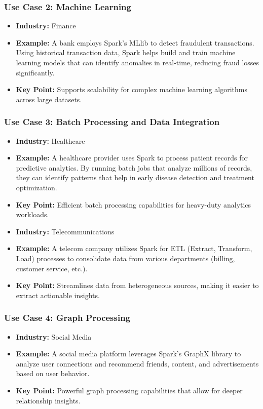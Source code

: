 \documentclass[aspectratio=169]{beamer}
\begin{document}
\begin{frame}[fragile]
    \frametitle{Use Case 2: Machine Learning}
    \begin{itemize}
        \item \textbf{Industry:} Finance
        \item \textbf{Example:} 
            A bank employs Spark's MLlib to detect fraudulent transactions. 
            Using historical transaction data, Spark helps build and train machine learning models that can identify anomalies in real-time, reducing fraud losses significantly.
        \item \textbf{Key Point:} Supports scalability for complex machine learning algorithms across large datasets.
    \end{itemize}
\end{frame}

\begin{frame}[fragile]
    \frametitle{Use Case 3: Batch Processing and Data Integration}
    \begin{itemize}
        \item \textbf{Industry:} Healthcare
        \item \textbf{Example:} 
            A healthcare provider uses Spark to process patient records for predictive analytics. 
            By running batch jobs that analyze millions of records, they can identify patterns that help in early disease detection and treatment optimization.
        \item \textbf{Key Point:} Efficient batch processing capabilities for heavy-duty analytics workloads.
    \end{itemize}
    
    \begin{itemize}
        \item \textbf{Industry:} Telecommunications
        \item \textbf{Example:} 
            A telecom company utilizes Spark for ETL (Extract, Transform, Load) processes to consolidate data from various departments (billing, customer service, etc.). 
        \item \textbf{Key Point:} Streamlines data from heterogeneous sources, making it easier to extract actionable insights.
    \end{itemize}
\end{frame}

\begin{frame}[fragile]
    \frametitle{Use Case 4: Graph Processing}
    \begin{itemize}
        \item \textbf{Industry:} Social Media
        \item \textbf{Example:} 
            A social media platform leverages Spark's GraphX library to analyze user connections and recommend friends, content, and advertisements based on user behavior.
        \item \textbf{Key Point:} Powerful graph processing capabilities that allow for deeper relationship insights.
    \end{itemize}
\end{frame}
\end{document}
